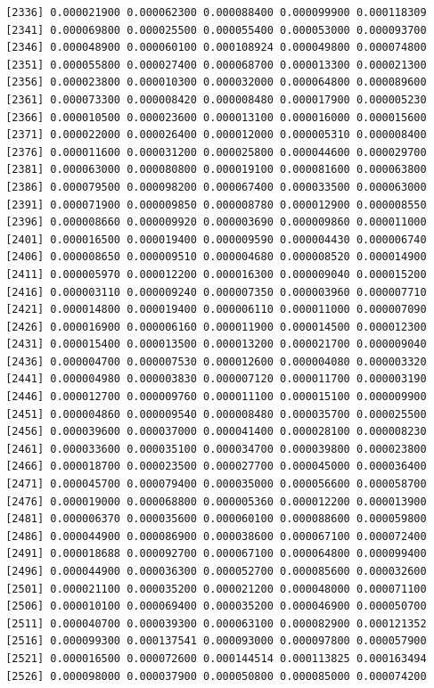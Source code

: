 \documentclass[]{article}
\begin{document}
\begin{verbatim}
 [2336] 0.000021900 0.000062300 0.000088400 0.000099900 0.000118309
 [2341] 0.000069800 0.000025500 0.000055400 0.000053000 0.000093700
 [2346] 0.000048900 0.000060100 0.000108924 0.000049800 0.000074800
 [2351] 0.000055800 0.000027400 0.000068700 0.000013300 0.000021300
 [2356] 0.000023800 0.000010300 0.000032000 0.000064800 0.000089600
 [2361] 0.000073300 0.000008420 0.000008480 0.000017900 0.000005230
 [2366] 0.000010500 0.000023600 0.000013100 0.000016000 0.000015600
 [2371] 0.000022000 0.000026400 0.000012000 0.000005310 0.000008400
 [2376] 0.000011600 0.000031200 0.000025800 0.000044600 0.000029700
 [2381] 0.000063000 0.000080800 0.000019100 0.000081600 0.000063800
 [2386] 0.000079500 0.000098200 0.000067400 0.000033500 0.000063000
 [2391] 0.000071900 0.000009850 0.000008780 0.000012900 0.000008550
 [2396] 0.000008660 0.000009920 0.000003690 0.000009860 0.000011000
 [2401] 0.000016500 0.000019400 0.000009590 0.000004430 0.000006740
 [2406] 0.000008650 0.000009510 0.000004680 0.000008520 0.000014900
 [2411] 0.000005970 0.000012200 0.000016300 0.000009040 0.000015200
 [2416] 0.000003110 0.000009240 0.000007350 0.000003960 0.000007710
 [2421] 0.000014800 0.000019400 0.000006110 0.000011000 0.000007090
 [2426] 0.000016900 0.000006160 0.000011900 0.000014500 0.000012300
 [2431] 0.000015400 0.000013500 0.000013200 0.000021700 0.000009040
 [2436] 0.000004700 0.000007530 0.000012600 0.000004080 0.000003320
 [2441] 0.000004980 0.000003830 0.000007120 0.000011700 0.000003190
 [2446] 0.000012700 0.000009760 0.000011100 0.000015100 0.000009900
 [2451] 0.000004860 0.000009540 0.000008480 0.000035700 0.000025500
 [2456] 0.000039600 0.000037000 0.000041400 0.000028100 0.000008230
 [2461] 0.000033600 0.000035100 0.000034700 0.000039800 0.000023800
 [2466] 0.000018700 0.000023500 0.000027700 0.000045000 0.000036400
 [2471] 0.000045700 0.000079400 0.000035000 0.000056600 0.000058700
 [2476] 0.000019000 0.000068800 0.000005360 0.000012200 0.000013900
 [2481] 0.000006370 0.000035600 0.000060100 0.000088600 0.000059800
 [2486] 0.000044900 0.000086900 0.000038600 0.000067100 0.000072400
 [2491] 0.000018688 0.000092700 0.000067100 0.000064800 0.000099400
 [2496] 0.000044900 0.000036300 0.000052700 0.000085600 0.000032600
 [2501] 0.000021100 0.000035200 0.000021200 0.000048000 0.000071100
 [2506] 0.000010100 0.000069400 0.000035200 0.000046900 0.000050700
 [2511] 0.000040700 0.000039300 0.000063100 0.000082900 0.000121352
 [2516] 0.000099300 0.000137541 0.000093000 0.000097800 0.000057900
 [2521] 0.000016500 0.000072600 0.000144514 0.000113825 0.000163494
 [2526] 0.000098000 0.000037900 0.000050800 0.000085000 0.000074200

\end{verbatim}
\end{document}
